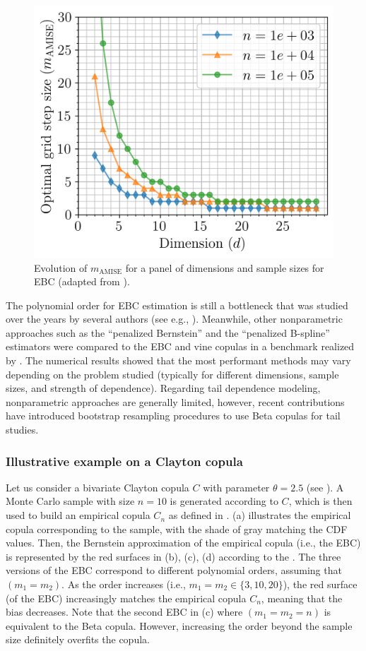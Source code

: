 \begin{figure}
    \centering
    \includegraphics[width=0.5\linewidth]{../numerical_experiments/chapter3/figures/hAMISE.png}
    \caption{Evolution of $m_{\mathrm{AMISE}}$ for a panel of dimensions and sample sizes for EBC (adapted from \citealp{lasserre_2022}).}
    \label{fig:hmise}
\end{figure}

The polynomial order for EBC estimation is still a bottleneck that was studied over the years by several authors (see e.g., \citealp{janssen_2012_ebc,bouezmarni_2013_EBC_convergence,rose_2015,segers_2017}).  
Meanwhile, other nonparametric approaches such as the ``penalized Bernstein'' and the ``penalized B-spline'' estimators were compared to the EBC and vine copulas in a benchmark realized by \citet{nagler_2017}. 
The numerical results showed that the most performant methods may vary depending on the problem studied (typically for different dimensions, sample sizes, and strength of dependence). 
Regarding tail dependence modeling, nonparametric approaches are generally limited, however, recent contributions \citep{kiriliouk_2021_resampling} have introduced bootstrap resampling procedures to use Beta copulas for tail studies.


\subsubsection{Illustrative example on a Clayton copula}
Let us consider a bivariate Clayton copula $C$ with parameter $\theta=2.5$ (see \citealp{nelsen_2006_copulas}). 
A Monte Carlo sample with size $n=10$ is generated according to $C$, which is then used to build an empirical copula $C_n$ as defined in . 
 (a) illustrates the empirical copula corresponding to the sample, with the shade of gray matching the CDF values. 
Then, the Bernstein approximation of the empirical copula (i.e., the EBC)  is represented by the red surfaces in  (b), (c), (d) according to the . 
The three versions of the EBC correspond to different polynomial orders, assuming that $(m_1=m_2)$. 
As the order increases (i.e., $m_1=m_2 \in \{3, 10, 20\}$), the red surface (of the EBC) increasingly matches the empirical copula $C_n$, meaning that the bias decreases. 
Note that the second EBC in  (c) where $(m_1=m_2=n)$ is equivalent to the Beta copula. 
However, increasing the order beyond the sample size definitely overfits the copula. 

